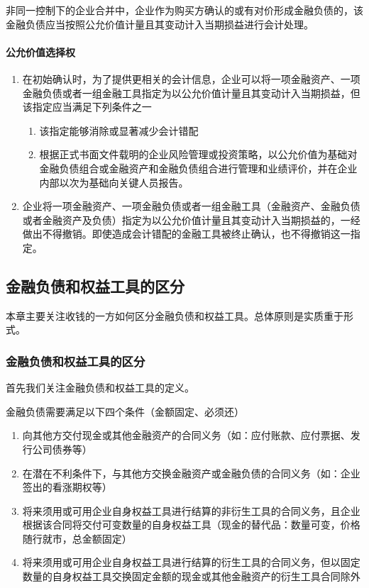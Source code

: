 \documentclass[UTF8,12pt]{ctexart}
\numberwithin{equation}{section} %
\numberwithin{figure}{section}
\numberwithin{table}{section}
\begin{document}
	非同一控制下的企业合并中，企业作为购买方确认的或有对价形成金融负债的，该金融负债应当按照公允价值计量且其变动计入当期损益进行会计处理。
	
	\paragraph{公允价值选择权}
	\begin{enumerate}
		\item 在初始确认时，为了提供更相关的会计信息，企业可以将一项金融资产、一项金融负债或者一组金融工具指定为以公允价值计量且其变动计入当期损益，但该指定应当满足下列条件之一
		\begin{enumerate}
			\item 该指定能够消除或显著减少会计错配
			
			\item 根据正式书面文件载明的企业风险管理或投资策略，以公允价值为基础对金融负债组合或金融资产和金融负债组合进行管理和业绩评价，并在企业内部以次为基础向关键人员报告。
		\end{enumerate}
		
		\item 企业将一项金融资产、一项金融负债或者一组金融工具（金融资产、金融负债或者金融资产及负债）指定为以公允价值计量且其变动计入当期损益的，一经做出不得撤销。即使造成会计错配的金融工具被终止确认，也不得撤销这一指定。
	\end{enumerate}
	
	\subsection{金融负债和权益工具的区分}
	本章主要关注收钱的一方如何区分金融负债和权益工具。总体原则是实质重于形式。
	
	\subsubsection{金融负债和权益工具的区分}
	首先我们关注金融负债和权益工具的定义。
	
	金融负债需要满足以下四个条件（金额固定、必须还）
	\begin{enumerate}
		\item 向其他方交付现金或其他金融资产的合同义务（如：应付账款、应付票据、发行公司债券等）
		
		\item 在潜在不利条件下，与其他方交换金融资产或金融负债的合同义务（如：企业签出的看涨期权等）
		
		\item 将来须用或可用企业自身权益工具进行结算的非衍生工具的合同义务，且企业根据该合同将交付可变数量的自身权益工具（现金的替代品：数量可变，价格随行就市，总金额固定）
		
		\item 将来须用或可用企业自身权益工具进行结算的衍生工具的合同义务，但以固定数量的自身权益工具交换固定金额的现金或其他金融资产的衍生工具合同除外
	\end{enumerate}
\end{document}
